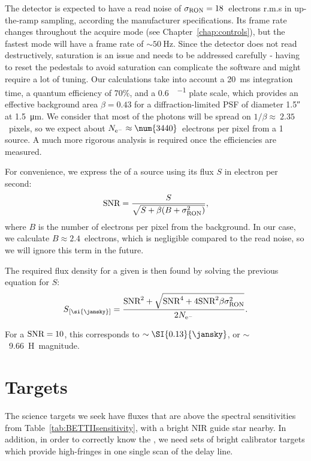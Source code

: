 The detector is expected to have a read noise of $\sigma_\textrm{RON} = 18$~electrons r.m.s in up-the-ramp sampling, according the manufacturer specifications. Its frame rate changes throughout the acquire mode (see Chapter~\ref{chap:controls}), but the fastest mode will have a frame rate of $\sim\SI{50}{\hertz}$. Since the detector does not read destructively, saturation is an issue and needs to be addressed carefully - having to reset the pedestals to avoid saturation can complicate the software and might require a lot of tuning. Our calculations take into account a \SI{20}{\milli\second} integration time, a quantum efficiency of 70\%, and a \SI{0.6}{\arcsec\per\pixel} plate scale, which provides an effective background area $\beta = 0.43$ for a diffraction-limited PSF of diameter \ang{;;1.5} at \SI{1.5}{\micro\meter}. We consider that most of the photons will be spread on $1/\beta\approx~2.35$~pixels, so we expect about $\Nel\approx\num{3440}$~electrons per pixel from a \SI{1}{\jansky} source. A much more rigorous analysis is required once the efficiencies are measured.

For convenience, we express the \SNR of a source using its flux $S$ in electron per second:
\begin{align}
\textrm{SNR} = \frac{S}{\sqrt{S + \beta(B + \sigma_\textrm{RON}^2)}},
\end{align}
where $B$ is the number of electrons per pixel from the background. In our case, we calculate $B\approx 2.4$~electrons, which is negligible compared to the read noise, so we will ignore this term in the future.

The required flux density for a given \SNR is then found by solving the previous equation for $S$:
\begin{align}
S\units{\si{\jansky}} = \frac{\SNR^2 + \sqrt{\SNR^4 + 4\SNR^2\beta\sigRON^2}}{2\Nel}.
\end{align}

For a $\textrm{SNR}=10$, this corresponds to $\sim\SI{0.13}{\jansky}$, or $\sim$~9.66~H~magnitude. 

\section{Targets}

The science targets we seek have fluxes that are above the spectral sensitivities from Table~\ref{tab:BETTIIsensitivity}, with a bright NIR guide star nearby. In addition, in order to correctly know the \OPD, we need sets of bright calibrator targets which provide high-\SNR fringes in one single scan of the delay line.

